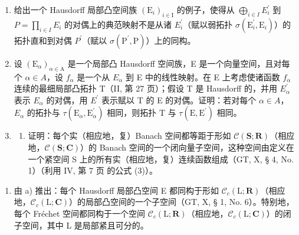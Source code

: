 \begin{enumerate}
\def\labelenumi{\arabic{enumi})}
\setcounter{enumi}{22}
\item
  给出一个 Hausdorff 局部凸空间族 \((\mathrm{E}_{i})_{i\in\mathrm{I}}\) 的例子，使得从 \(\bigoplus_{i\in I} E_{i}^{\prime}\) 到 \(P = \prod_{i\in I} E_{i}\) 的对偶上的典范映射不是从诸 \(E_{i}^{\prime}\)（赋以弱拓扑 \(\sigma(\mathrm{E}_{i}^{\prime}, \mathrm{E}_{i})\)）的拓扑直和到对偶 \(P^{\prime}\)（赋以 \(\sigma(\mathrm{P}^{\prime}, \mathrm{P})\)）上的同构。
\item
  设 \((\mathrm{E}_{\alpha})_{\alpha\in\mathrm{A}}\) 是一个局部凸 Hausdorff 空间族，E 是一个向量空间，且对每个 \(\alpha\in A\)，设 \(f_{\alpha}\) 是一个从 \(E_{\alpha}\) 到 E 中的线性映射。在 E 上考虑使诸函数 \(f_{\alpha}\) 连续的最细局部凸拓扑 T（II, 第 27 页）；假设 T 是 Hausdorff 的，并用 \(E_{\alpha}^{\prime}\) 表示 \(E_{\alpha}\) 的对偶，用 \(E^{\prime}\) 表示赋以 T 的 E 的对偶。证明：若对每个 \(\alpha\in A\)，\(E_{\alpha}\) 的拓扑与 \(\tau(\mathrm{E}_{\alpha},\mathrm{E}_{\alpha}^{\prime})\) 相同，则拓扑 T 与 \(\tau(\mathrm{E},\mathrm{E}^{\prime})\) 相同。
\item
  \begin{enumerate}
  \def\labelenumii{\alph{enumii})}
  \tightlist
  \item
    证明：每个实（相应地，复）Banach 空间都等距于形如 \(\mathcal{C}(\mathbf{S};\mathbf{R})\)（相应地，\(\mathcal{C}(\mathbf{S};\mathbf{C})\)）的 Banach 空间的一个闭向量子空间，这种空间由定义在一个紧空间 S 上的所有实（相应地，复）连续函数组成（GT, X, § 4, No. 1）（利用 IV, 第 7 页 的公式 (3)）。
  \end{enumerate}
\end{enumerate}

\begin{enumerate}
\def\labelenumi{\alph{enumi})}
\setcounter{enumi}{1}
\tightlist
\item
  由 a) 推出：每个 Hausdorff 局部凸空间 E 都同构于形如 \(\mathcal{C}_{c}(\mathrm{L};\mathbf{R})\)（相应地，\(\mathcal{C}_{c}(\mathrm{L};\mathbf{C})\)）的局部凸空间的一个子空间（GT, X, § 1, No. 6）。特别地，每个 Fréchet 空间都同构于一个空间 \(\mathcal{C}_{c}(\mathrm{L};\mathbf{R})\)（相应地，\(\mathcal{C}_{c}(\mathrm{L};\mathbf{C})\)）的闭子空间，其中 L 是局部紧且可分的。
\end{enumerate}
\relax{}
